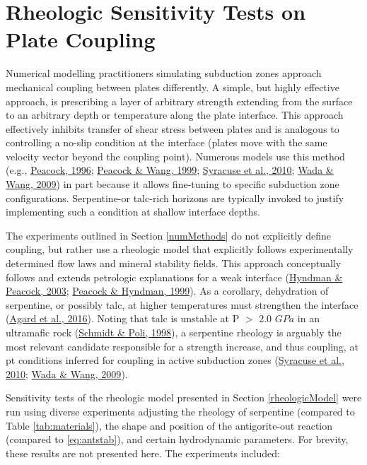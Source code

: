 \hypertarget{rheologicSensitivity}{%
\section{Rheologic Sensitivity Tests on Plate Coupling}\label{rheologicSensitivity}}

Numerical modelling practitioners simulating subduction zones approach mechanical coupling between plates differently. A simple, but highly effective approach, is prescribing a layer of arbitrary strength extending from the surface to an arbitrary depth or temperature along the plate interface. This approach effectively inhibits transfer of shear stress between plates and is analogous to controlling a no-slip condition at the interface (plates move with the same velocity vector beyond the coupling point). Numerous models use this method (e.g., \protect\hyperlink{ref-peacock1996}{Peacock, 1996}; \protect\hyperlink{ref-peacock1999b}{Peacock \& Wang, 1999}; \protect\hyperlink{ref-syracuse2010}{Syracuse et al., 2010}; \protect\hyperlink{ref-wada2009}{Wada \& Wang, 2009}) in part because it allows fine-tuning to specific subduction zone configurations. Serpentine-or talc-rich horizons are typically invoked to justify implementing such a condition at shallow interface depths.

The experiments outlined in Section \ref{numMethods} do not explicitly define coupling, but rather use a rheologic model that explicitly follows experimentally determined flow laws and mineral stability fields. This approach conceptually follows and extends petrologic explanations for a weak interface (\protect\hyperlink{ref-hyndman2003}{Hyndman \& Peacock, 2003}; \protect\hyperlink{ref-peacock1999a}{Peacock \& Hyndman, 1999}). As a corollary, dehydration of serpentine, or possibly talc, at higher temperatures must strengthen the interface (\protect\hyperlink{ref-agard2016}{Agard et al., 2016}). Noting that talc is unstable at P \(>\) 2.0 \(GPa\) in an ultramafic rock (\protect\hyperlink{ref-schmidt1998}{Schmidt \& Poli, 1998}), a serpentine rheology is arguably the most relevant candidate responsible for a strength increase, and thus coupling, at \gls{pt} conditions inferred for coupling in active subduction zones (\protect\hyperlink{ref-syracuse2010}{Syracuse et al., 2010}; \protect\hyperlink{ref-wada2009}{Wada \& Wang, 2009}).

Sensitivity tests of the rheologic model presented in Section \ref{rheologicModel} were run using diverse experiments adjusting the rheology of serpentine (compared to Table \ref{tab:materials}), the shape and position of the antigorite-out reaction (compared to \eqref{eq:antstab}), and certain hydrodynamic parameters. For brevity, these results are not presented here. The experiments included:

